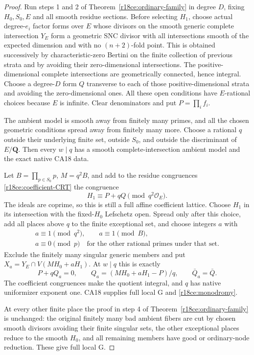 \begin{proof}
Run steps 1 and 2 of
Theorem~\ref{r18ce:ordinary-family} in degree $D$,
fixing $H_0,S_0,E$ and all smooth residue sections.
Before selecting $H_1$, choose actual degree-$e_i$
factor forms over $E$ whose divisors on the smooth
generic complete intersection $Y_E$ form a geometric
SNC divisor with all intersections smooth of the
expected dimension and with no $(n+2)$-fold point.
This is obtained successively by characteristic-zero
Bertini on the finite collection of previous strata
and by avoiding their zero-dimensional intersections.
The positive-dimensional complete intersections are
geometrically connected, hence integral.  Choose
a degree-$D$ form $Q$ transverse to each of those
positive-dimensional strata and avoiding the
zero-dimensional ones.  All these open conditions
have $E$-rational choices because $E$ is infinite.
Clear denominators and put $P=\prod_i f_i$.

The ambient model is smooth away from finitely
many primes, and all the chosen geometric
conditions spread away from finitely many more.
Choose a rational $q$ outside their underlying
finite set, outside $S_0$, and outside the
discriminant of $E/\mathbf Q$.  Then every
$w\mid q$ has a smooth complete-intersection
ambient model and the exact native CA18 data.

Let $B=\prod_{p\in S_0}p$, $M=q^2B$, and add
to the residue congruences \eqref{r18ce:coefficient-CRT}
the congruence
\[
                         H_1\equiv P+qQ\pmod{q^2\mathcal O_E}.
 \tag{CE18.6}\label{r18ce:deep-CRT}
\]
The ideals are coprime, so this is still a full
affine coefficient lattice.  Choose $H_1$ in
its intersection with the fixed-$H_0$ Lefschetz
open.  Spread only after this choice, add all
places above $q$ to the finite exceptional set,
and choose integers $a$ with
\[
 \begin{gathered}
 a\equiv1\pmod{q^2},\qquad a\equiv1\pmod B,\\
 a\equiv0\pmod p
   \quad\text{for the other rational primes under that set}.
 \end{gathered}
 \tag{CE18.7}\label{r18ce:deep-parameters}
\]
Exclude the finitely many singular generic members
and put $X_a=Y_E\cap V(MH_0+aH_1)$.
At $w\mid q$ this is exactly
\[
                  P+qQ_a=0,\qquad
            Q_a=(MH_0+aH_1-P)/q,\qquad\bar Q_a=\bar Q.
\]
The coefficient congruences make the quotient
integral, and $q$ has native uniformizer exponent
one.  CA18 supplies full local G and
\eqref{r18ce:monodromy}.

At every other finite place the proof in step 4
of Theorem~\ref{r18ce:ordinary-family} is unchanged:
the original finitely many bad ambient fibers
are cut by chosen smooth divisors avoiding their
finite singular sets, the other exceptional
places reduce to the smooth $H_0$, and all
remaining members have good or ordinary-node
reduction.  These give full local G.


\end{proof}
